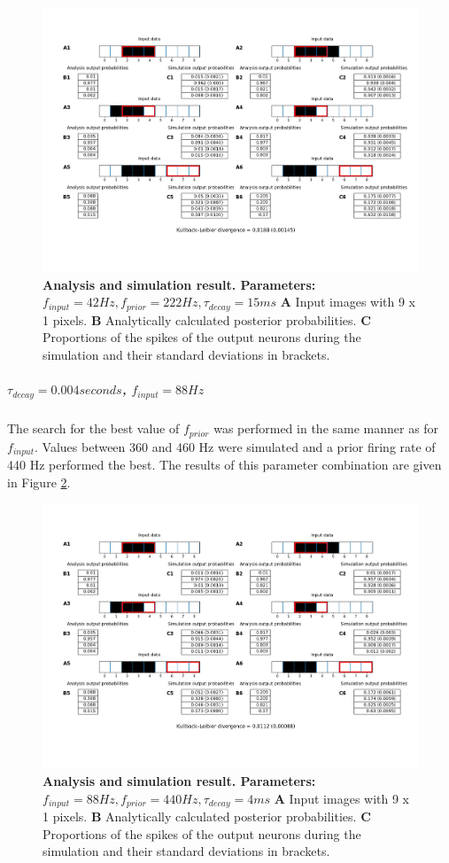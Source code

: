 \begin{figure}
  \includegraphics[width=\linewidth]{figures/1D/1D_42_222_15.png}
  \caption{\textbf{Analysis and simulation result. Parameters: } $f_{input} = 42 Hz, f_{prior} = 222 Hz, \tau_{decay} = 15 ms$ \textbf{A} Input images with 9 x 1 pixels. \textbf{B} Analytically calculated posterior probabilities. \textbf{C} Proportions of the spikes of the output neurons during the simulation and their standard deviations in brackets.}
  \label{fig:1D_42_222_15}
\end{figure}

\subparagraph{$\tau_{decay} = 0.004 seconds$, $f_{input} = 88 Hz$}
The search for the best value of $f_{prior}$ was performed in the same manner as for $f_{input}$. Values between 360 and 460 Hz were simulated and a prior firing rate of 440 Hz performed the best. The results of this parameter combination are given in Figure \ref{fig:1D_88_440_4}.

\begin{figure}
  \includegraphics[width=\linewidth]{figures/1D/1D_88_440_4.png}
  \caption{\textbf{Analysis and simulation result. Parameters: } $f_{input} = 88 Hz, f_{prior} = 440 Hz, \tau_{decay} = 4 ms$ \textbf{A} Input images with 9 x 1 pixels. \textbf{B} Analytically calculated posterior probabilities. \textbf{C} Proportions of the spikes of the output neurons during the simulation and their standard deviations in brackets.}
  \label{fig:1D_88_440_4}
\end{figure}

